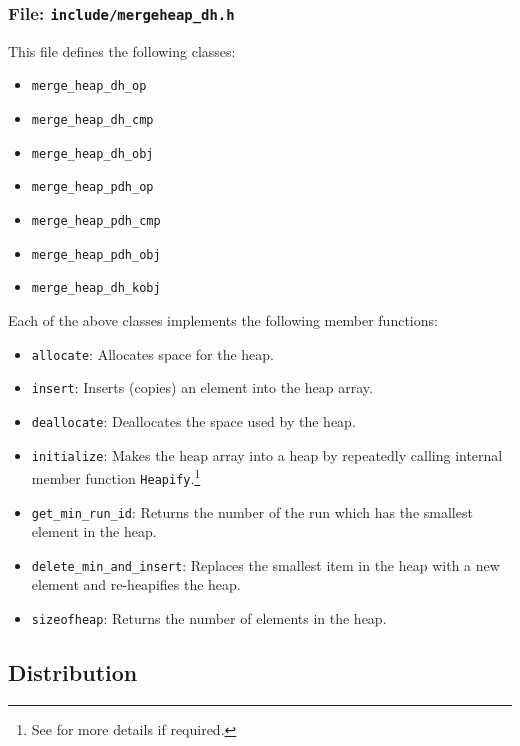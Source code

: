 \subsubsection{File: \texttt{include/mergeheap\_dh.h}}

This file defines the following classes:
\begin{itemize}
    \item \lstinline|merge_heap_dh_op|
    \item \lstinline|merge_heap_dh_cmp|
    \item \lstinline|merge_heap_dh_obj|
    \item \lstinline|merge_heap_pdh_op|
    \item \lstinline|merge_heap_pdh_cmp|
    \item \lstinline|merge_heap_pdh_obj|
    \item \lstinline|merge_heap_dh_kobj|
\end{itemize}

Each of the above classes implements the following member
functions:
\begin{itemize}
    \item \lstinline|allocate|: Allocates space for the heap.
    \item \lstinline|insert|: Inserts (copies) an element into
    the heap array.
    \item \lstinline|deallocate|: Deallocates the space used by the heap.
    \item \lstinline|initialize|: Makes the heap array into a heap
    by repeatedly calling internal member function
    \lstinline|Heapify|.\footnote{%
       See \cite{cormen:introduction} for more details if
       required.}
    \item \lstinline|get_min_run_id|: Returns the number of the
    run which has the smallest element in the heap.
    \item \lstinline|delete_min_and_insert|: Replaces the
    smallest item in the heap with a new element  and
    re-heapifies the heap.
    \item \lstinline|sizeofheap|: Returns the number of elements
    in the heap.
\end{itemize}




\subsection{Distribution}

